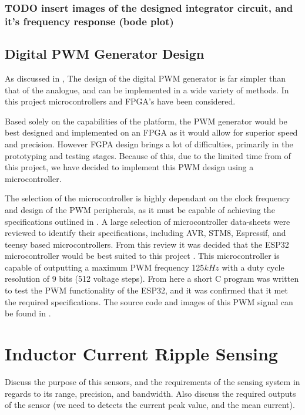 \subsubsection{TODO insert images of the designed integrator circuit, and it's frequency response (bode plot)} 

\subsection{Digital PWM Generator Design}\label{S:PWM_digital_design}

As discussed in , The design of the digital PWM generator is far simpler than that of the analogue, and can be implemented in a wide variety of methods. In this project microcontrollers and FPGA's have been considered.

Based solely on the capabilities of the platform, the PWM generator would be best designed and implemented on an FPGA as it would allow for superior speed and precision. However FGPA design brings a lot of difficulties, primarily in the prototyping and testing stages. Because of this, due to the limited time from of this project, we have decided to implement this PWM design using a microcontroller.

The selection of the microcontroller is highly dependant on the clock frequency and design of the PWM peripherals, as it must be capable of achieving the specifications outlined in . A large selection of microcontroller data-sheets were reviewed to identify their specifications, including AVR, STM8, Espressif, and teensy based microcontrollers. From this review it was decided that the ESP32 microcontroller would be best suited to this project \cite{ESP32Manual}. This microcontroller is capable of outputting a maximum PWM frequency 125$kHz$ with a duty cycle resolution of 9 bits (512 voltage steps). From here a short C program was written to test the PWM functionality of the ESP32, and it was confirmed that it met the required specifications. The source code and images of this PWM signal can be found in .
 

%
%

\section{Inductor Current Ripple Sensing}\label{S:current_sense_design}

Discuss the purpose of this sensors, and the requirements of the sensing system in regards to its range, precision, and bandwidth. Also discuss the required outputs of the sensor (we need to detects the current peak value, and the mean current).


